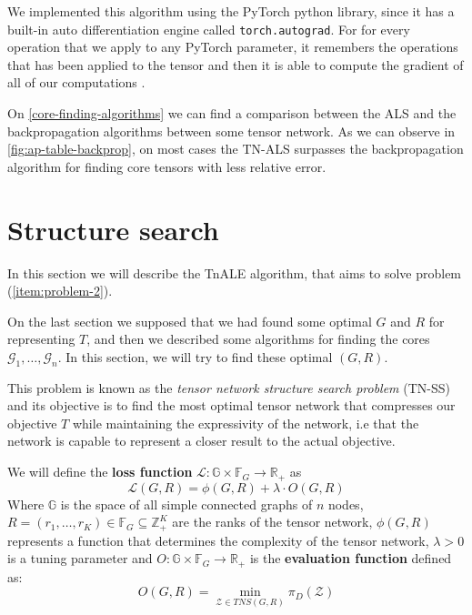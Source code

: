 \documentclass[11pt,a4paper,openright,oneside]{book}
\numberwithin{equation}{section}
\newcommand{\figref}[1]{\cref{#1}}
\begin{document}
{We implemented this algorithm using the PyTorch python library, since it has a built-in auto differentiation engine called \verb/torch.autograd/. For 
for every operation that we apply to any PyTorch parameter, it remembers the operations that has been applied to the tensor and then it is able
to compute the gradient of all of our computations \cite{AutomaticDifferentiationTorchautograd}.

On \cref{core-finding-algorithms} we can find a comparison between the ALS and the backpropagation algorithms between some tensor network.
As we can observe in
\figref{fig:ap-table-backprop}, on most cases the TN-ALS surpasses the backpropagation
algorithm for finding core tensors with less relative error.

\section{Structure search}

In this section we will describe the TnALE algorithm, that aims to solve problem (\ref{item:problem-2}).

On the last section we supposed that we had found some optimal $G$ and $R$ for representing $T$, and then we 
described some algorithms for finding the cores $\mathcal{G}_1, \dots, \mathcal{G}_n$. In this section,
we will try to find these optimal $(G, R)$.

This problem is known as the \textit{tensor network structure search problem} (\gls{TN-SS}) and its objective 
is to find the most optimal tensor network that 
compresses our objective $T$ while maintaining the expressivity of the network, i.e that the network
is capable to represent a closer result to the actual objective. 

We will define the \textbf{loss function} $\mathcal{L}: \mathbb{G} \times \mathbb{F}_G \rightarrow \mathbb{R}_+$ as
$$\mathcal{L}(G,R) = \phi(G, R) + \lambda \cdot O(G, R) $$
Where $\mathbb{G}$ is the space of all simple connected graphs of $n$ nodes, ${R = (r_1, \dots, r_K) \in \mathbb{F}_G \subseteq
\mathbb{Z}_+^K}$ are the ranks of the tensor network, $\phi(G, R)$ represents a function that determines the complexity of the
tensor network, $\lambda > 0$ is a tuning parameter and $O: \mathbb{G} \times \mathbb{F}_G \rightarrow \mathbb{R}_+$ is the 
\textbf{evaluation function} defined as:
\begin{equation}
    O(G, R) = \min_{\mathcal{Z} \in TNS(G,R)} \pi_D (\mathcal{Z})
    \label{eq:tnale-min-obj}
\end{equation}

}
\end{document}
